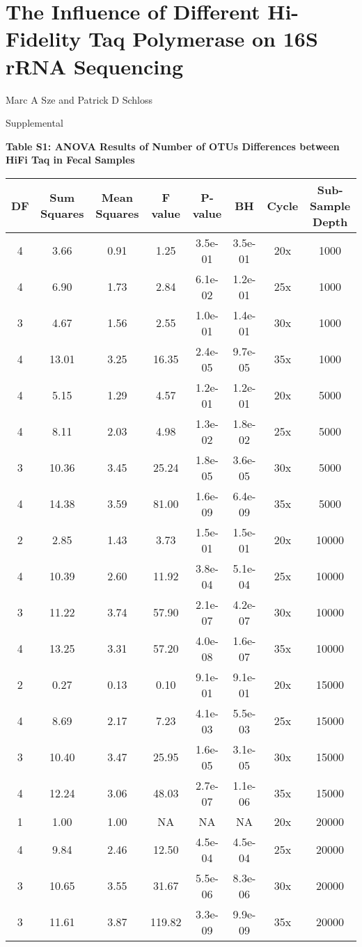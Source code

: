 \documentclass[12pt,]{article}
\title{}
\author{}
\date{}
\begin{document}
\section{The Influence of Different Hi-Fidelity Taq Polymerase on 16S
rRNA
Sequencing}\label{the-influence-of-different-hi-fidelity-taq-polymerase-on-16s-rrna-sequencing}

\vspace{10mm}

\begin{center}
Marc A Sze and Patrick D Schloss

\vspace{10mm}

Supplemental
\end{center}

\newpage

\textbf{Table S1: ANOVA Results of Number of OTUs Differences between
HiFi Taq in Fecal Samples}

\begin{longtable}[]{@{}cccccccc@{}}
\toprule
DF & Sum Squares & Mean Squares & F value & P-value & BH & Cycle &
Sub-Sample Depth\tabularnewline
\midrule
\endhead
4 & 3.66 & 0.91 & 1.25 & 3.5e-01 & 3.5e-01 & 20x & 1000\tabularnewline
4 & 6.90 & 1.73 & 2.84 & 6.1e-02 & 1.2e-01 & 25x & 1000\tabularnewline
3 & 4.67 & 1.56 & 2.55 & 1.0e-01 & 1.4e-01 & 30x & 1000\tabularnewline
4 & 13.01 & 3.25 & 16.35 & 2.4e-05 & 9.7e-05 & 35x & 1000\tabularnewline
4 & 5.15 & 1.29 & 4.57 & 1.2e-01 & 1.2e-01 & 20x & 5000\tabularnewline
4 & 8.11 & 2.03 & 4.98 & 1.3e-02 & 1.8e-02 & 25x & 5000\tabularnewline
3 & 10.36 & 3.45 & 25.24 & 1.8e-05 & 3.6e-05 & 30x & 5000\tabularnewline
4 & 14.38 & 3.59 & 81.00 & 1.6e-09 & 6.4e-09 & 35x & 5000\tabularnewline
2 & 2.85 & 1.43 & 3.73 & 1.5e-01 & 1.5e-01 & 20x & 10000\tabularnewline
4 & 10.39 & 2.60 & 11.92 & 3.8e-04 & 5.1e-04 & 25x &
10000\tabularnewline
3 & 11.22 & 3.74 & 57.90 & 2.1e-07 & 4.2e-07 & 30x &
10000\tabularnewline
4 & 13.25 & 3.31 & 57.20 & 4.0e-08 & 1.6e-07 & 35x &
10000\tabularnewline
2 & 0.27 & 0.13 & 0.10 & 9.1e-01 & 9.1e-01 & 20x & 15000\tabularnewline
4 & 8.69 & 2.17 & 7.23 & 4.1e-03 & 5.5e-03 & 25x & 15000\tabularnewline
3 & 10.40 & 3.47 & 25.95 & 1.6e-05 & 3.1e-05 & 30x &
15000\tabularnewline
4 & 12.24 & 3.06 & 48.03 & 2.7e-07 & 1.1e-06 & 35x &
15000\tabularnewline
1 & 1.00 & 1.00 & NA & NA & NA & 20x & 20000\tabularnewline
4 & 9.84 & 2.46 & 12.50 & 4.5e-04 & 4.5e-04 & 25x & 20000\tabularnewline
3 & 10.65 & 3.55 & 31.67 & 5.5e-06 & 8.3e-06 & 30x &
20000\tabularnewline
3 & 11.61 & 3.87 & 119.82 & 3.3e-09 & 9.9e-09 & 35x &
20000\tabularnewline
\bottomrule
\end{longtable}
\end{document}
